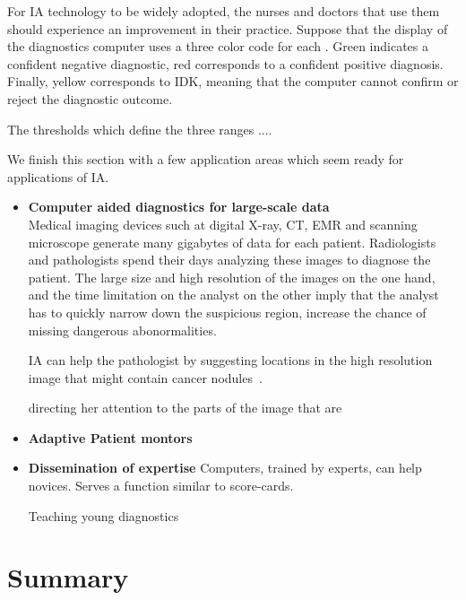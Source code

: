 \documentclass[12pt]{article}
\begin{document}
  For IA technology to be widely adopted, the nurses and doctors that
  use them should experience an improvement in their practice. Suppose
  that the display of the diagnostics computer uses a three color code
  for each . Green indicates a confident
  negative diagnostic, red corresponds to a confident positive
  diagnosis. Finally, yellow corresponds to IDK, meaning that the
  computer cannot confirm or reject the diagnostic outcome.

  The thresholds which define the three ranges .... 


  
  We finish this section with a few application areas which seem ready
  for applications of IA.
  
\begin{itemize}
\item{\bf Computer aided diagnostics for large-scale data}\\
  Medical imaging devices such at digital X-ray, CT, EMR and scanning
  microscope generate many gigabytes of data for each
  patient. Radiologists and pathologists spend their days analyzing
  these images to diagnose the patient. The large size and high
  resolution of the images on the one hand, and the time limitation on
  the analyst on the other imply that the analyst has to quickly
  narrow down the suspicious region, increase the chance of missing
  dangerous abonormalities.

  IA can help the pathologist by suggesting locations in the high
  resolution image that might contain cancer nodules~\cite{}.

  directing her attention to the
  parts of the image that are 

\item{\bf Adaptive Patient montors}
  
\item {\bf Dissemination of expertise}
Computers, trained by experts, can help novices.  Serves a function
similar to score-cards.

Teaching young diagnostics
\end{itemize}

\section*{Summary}

% 

\end{document}
